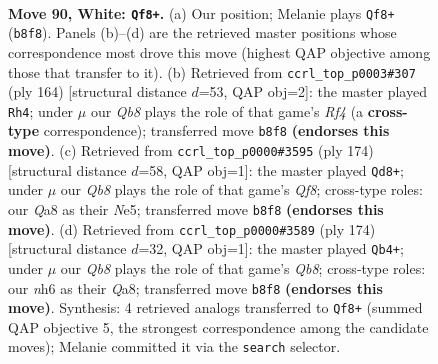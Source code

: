 \documentclass[11pt]{article}
\begin{document}
\clearpage

\begin{figure}[p]\centering
\begin{subfigure}{0.46\textwidth}\centering
\resizebox{\linewidth}{!}{%
\newchessgame
\chessboard[
  setfen={QQ6/6k1/7n/7r/8/8/8/KR6 w - - 1 90},
  showmover=false,
  pgfstyle=straightmove, color=movearrow, markmove={b8-f8}
]}
\caption{}
\end{subfigure}\hfill
\begin{subfigure}{0.46\textwidth}\centering
\resizebox{\linewidth}{!}{%
\newchessgame
\chessboard[
  setfen={8/5Q2/8/6k1/K4R2/R7/8/8 w - - 1 83},
  showmover=false,
  pgfstyle=straightmove, color=movearrow, markmove={f4-h4}
]}
\caption{}
\end{subfigure}
\\[4pt]
\begin{subfigure}{0.46\textwidth}\centering
\resizebox{\linewidth}{!}{%
\newchessgame
\chessboard[
  setfen={5Q1R/2k5/4K3/4N3/8/8/8/1r6 w - - 1 88},
  showmover=false,
  pgfstyle=straightmove, color=movearrow, markmove={f8-d8}
]}
\caption{}
\end{subfigure}\hfill
\begin{subfigure}{0.46\textwidth}\centering
\resizebox{\linewidth}{!}{%
\newchessgame
\chessboard[
  setfen={QQ6/8/8/2k5/8/8/2K3R1/8 w - - 1 88},
  showmover=false,
  pgfstyle=straightmove, color=movearrow, markmove={b8-b4}
]}
\caption{}
\end{subfigure}
\caption{\textbf{Move 90, White: \texttt{Qf8+}.} (a) Our position; Melanie plays \texttt{Qf8+} (\texttt{b8f8}). Panels (b)--(d) are the retrieved master positions whose correspondence most drove this move (highest QAP objective among those that transfer to it). (b) Retrieved from \texttt{ccrl\_top\_p0003\#307} (ply 164) [structural distance $d$=53, QAP obj=2]: the master played \texttt{Rh4}; under $\mu$ our \emph{Qb8} plays the role of that game's \emph{Rf4} (a \textbf{cross-type} correspondence); transferred move \texttt{b8f8} \textbf{(endorses this move)}. (c) Retrieved from \texttt{ccrl\_top\_p0000\#3595} (ply 174) [structural distance $d$=58, QAP obj=1]: the master played \texttt{Qd8+}; under $\mu$ our \emph{Qb8} plays the role of that game's \emph{Qf8}; cross-type roles: our \emph{Q}a8 as their \emph{N}e5; transferred move \texttt{b8f8} \textbf{(endorses this move)}. (d) Retrieved from \texttt{ccrl\_top\_p0000\#3589} (ply 174) [structural distance $d$=32, QAP obj=1]: the master played \texttt{Qb4+}; under $\mu$ our \emph{Qb8} plays the role of that game's \emph{Qb8}; cross-type roles: our \emph{n}h6 as their \emph{Q}a8; transferred move \texttt{b8f8} \textbf{(endorses this move)}. Synthesis: 4 retrieved analogs transferred to \texttt{Qf8+} (summed QAP objective 5, the strongest correspondence among the candidate moves); Melanie committed it via the \texttt{search} selector.}
\label{fig:thought-m178}
\end{figure}
\end{document}
